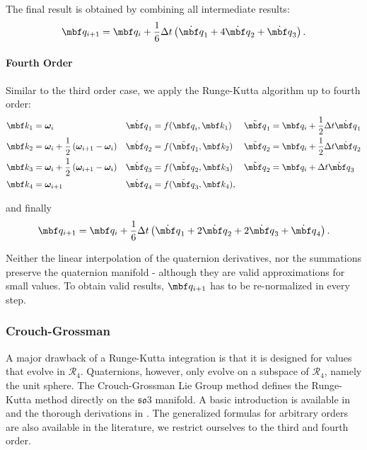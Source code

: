 \documentclass[10pt,a4paper]{article}
\newcommand{\mbs}[1]{{\boldsymbol{#1}}}
\numberwithin{equation}{section}
\begin{document}
The final result is obtained by combining all intermediate results:
\begin{equation}
\mbf q_{i+1} = \mbf q_i + \dfrac{1}{6} \Delta t \left(
	\dot{\mbf q}_1 +
	4 \dot{\mbf q}_2 +
	\dot{\mbf q}_3
\right).
\label{eq:rk3}
\end{equation}

\paragraph{Fourth Order}
Similar to the third order case, we apply the Runge-Kutta algorithm up to fourth order:
\begin{align*}
\mbf k_1 &= \mbs \omega_i &
\dot{\mbf q}_1 &= f({\mbf q}_i , \mbf k_1) &
\tilde{\mbf q}_1 &= \mbf q_i +\dfrac{1}{2} \Delta t \dot{\mbf q}_1 \\
\mbf k_2 &= \mbs \omega_i + \dfrac{1}{2}\left( \mbs \omega_{i+1} - \mbs \omega_i \right) &
\dot{\mbf q}_2 &= f(\tilde{\mbf q}_1, \mbf k_2) &
\tilde{\mbf q}_2 &= \mbf q_i +\dfrac{1}{2} \Delta t \dot{\mbf q}_2 \\
\mbf k_3 &= \mbs \omega_i + \dfrac{1}{2}\left( \mbs \omega_{i+1} - \mbs \omega_i \right) &
\dot{\mbf q}_3 &= f(\tilde{\mbf q}_2, \mbf k_3) &
\tilde{\mbf q}_2 &= \mbf q_i + \Delta t \dot{\mbf q}_3 \\
\mbf k_4  &=  \mbs \omega_{i+1} &
\dot{\mbf q}_4 &= f(\tilde{\mbf q}_3 , \mbf k_4), &
\end{align*}

and finally
\begin{equation}
\mbf q_{i+1} = \mbf q_i + \dfrac{1}{6} \Delta t \left(
	\dot{\mbf q}_1 +
	2 \dot{\mbf q}_2 +
	2 \dot{\mbf q}_3 +
	\dot{\mbf q}_4
\right).
\label{eq:rk4}
\end{equation}

Neither the linear interpolation of the quaternion derivatives, nor the summations preserve the quaternion manifold - although they are valid approximations for small values. To obtain valid results, $\mbf q_{i+1}$ has to be re-normalized in every step.

\subsubsection{Crouch-Grossman}

A major drawback of a Runge-Kutta integration is that it is designed for values that evolve in $\mathcal{R}_4$.
Quaternions, however, only evolve on a subspace of $\mathcal{R}_4$, namely the unit sphere.
The Crouch-Grossman Lie Group method defines the Runge-Kutta method directly on the $\mathfrak{so}3$ manifold.
A basic introduction is available in \cite{andrle_crassidist} and the thorough derivations in \cite{crouch_grossman}.
The generalized formulas for arbitrary orders are also available in the literature, we restrict ourselves to the third and fourth order.
\end{document}
